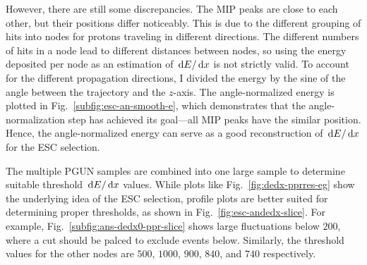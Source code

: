      However, there are still some discrepancies.
     The MIP peaks are close to each other, but their positions differ noticeably.
     This is due to the different grouping of hits into nodes for protons traveling in different directions.
     The different numbers of hits in a node lead to different distances between nodes, so using the energy deposited per node as an estimation of $\,\textrm{d}E/\,\textrm{d}x$ is not strictly valid.
     To account for the different propagation directions, I divided the energy by the sine of the angle between the trajectory and the $z$-axis.
     The angle-normalized energy is plotted in Fig.~\ref{subfig:esc-an-smooth-e}, which demonstrates that the angle-normalization step has achieved its goal—all MIP peaks have the similar position.
     Hence, the angle-normalized energy can serve as a good reconstruction of $\,\textrm{d}E/\,\textrm{d}x$ for the ESC selection.

     The multiple PGUN samples are combined into one large sample to determine suitable threshold $\,\textrm{d}E/\,\textrm{d}x$ values.
     While plots like Fig.~\ref{fig:dedx-pprres-eg} show the underlying idea of the ESC selection, profile plots are better suited for determining proper thresholds, as shown in Fig.~\ref{fig:esc-andedx-slice}.
     For example, Fig.~\ref{subfig:ans-dedx0-ppr-slice} shows large fluctuations below $200$, where a cut should be palced to exclude events below.
     Similarly, the threshold values for the other nodes are $500$, $1000$, $900$, $840$, and $740$ respectively.

